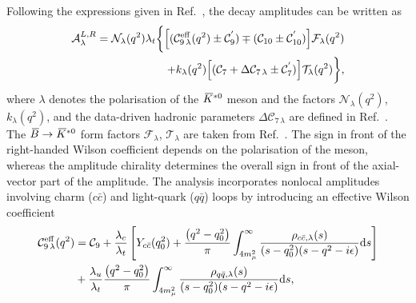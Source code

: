 Following the expressions given in Ref.~\cite{LHCb-PAPER-2024-011}, the \BdbToKstbMuMu decay amplitudes can be written as
\begin{equation}
    \begin{split}
        \displaystyle \mathcal{A}^{L,R}_{\lambda} =\mathcal{N}_{\lambda}(q^2) \lambda_t \bigg\{ \Big[ (\mathcal{C}_{9\,\lambda}^{\rm eff}({q^2}) \pm \mathcal{C}_{9}^{'})\mp (\mathcal{C}_{10} \pm \mathcal{C}_{10}^{'}) \Big]\mathcal{F}_{\lambda}(q^2)\\ + k_{\lambda}(q^2)\Big[(\mathcal{C}_{7}+\Delta\mathcal{C}_{7\,\lambda}\pm\mathcal{C}_{7}^{'})\Big]\mathcal{T}_{\lambda}(q^2)\bigg\},
    \end{split}\label{eq:amplitudes}
\end{equation}
where $\lambda$ denotes the polarisation of the ${{\kern 0.18em\overline{\kern -0.18em K}}{}^{*0}}$ meson and the factors $\mathcal{N}_{\lambda}(q^2)$, $k_{\lambda}(q^2)$, and the data-driven hadronic parameters $\Delta\mathcal{C}_{7\,\lambda}$ are defined in Ref.~\cite{LHCb-PAPER-2024-011}. The ${\kern 0.18em\overline{\kern -0.18em B}}\rightarrow {\ensuremath{{\kern 0.18em\overline{\kern -0.18em K}}{}^{*0}}}$ form factors $\mathcal{F}_{\lambda}$, $\mathcal{T}_{\lambda}$ are taken from Ref.~\cite{Gubernari:2022hxn}. The sign in front of the right-handed Wilson coefficient depends on the polarisation of the \Kstarzb meson, whereas the amplitude chirality determines the overall sign in front of the axial-vector part of the amplitude.
The analysis incorporates nonlocal amplitudes involving charm ($c\bar{c}$) and light-quark ($q\bar{q}$) loops by introducing an effective Wilson coefficient
\begin{equation}
    \begin{split}
        \mathcal{C}_{9\,\lambda}^{\rm eff} ({q^2}) &= {\mathcal C_9} + \frac{\lambda_c}{\lambda_t} \left[ Y_{c\bar{c}} (q^2_0) + \frac{\left( {q^2} - q^2_0 \right)}{\pi} \int^\infty_{4m_\mu^2} \frac{\rho_{c \bar{c}, \lambda} (s)}{(s - q^2_0) (s - {q^2} - i \epsilon)} \mathrm{d} s \right] \\
        &+ \frac{\lambda_u}{\lambda_t}  \frac{\left( {q^2} - q^2_0 \right)}{\pi} \int^\infty_{4m_\mu^2} \frac{\rho_{q \bar{q}, \lambda} (s)}{(s - q^2_0) (s - {q^2} - i \epsilon)} \mathrm{d} s,
    \end{split}
    \label{eq:dispersionRelation}
\end{equation}
